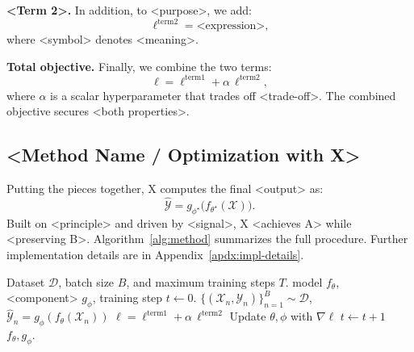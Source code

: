 \textbf{<Term 2>.} In addition, to <purpose>, we add:
\begin{equation} \label{eq:term-2}
    \ell^{\text{term2}} = \text{<expression>},
\end{equation}
where <symbol> denotes <meaning>.

\textbf{Total objective.} Finally, we combine the two terms:
\begin{equation} \label{eq:total}
    \ell = \ell^{\text{term1}} + \alpha \, \ell^{\text{term2}},
\end{equation}
where $\alpha$ is a scalar hyperparameter that trades off <trade-off>. The combined objective secures <both properties>.

\subsection{<Method Name / Optimization with X>} \label{sec:method-overall}
Putting the pieces together, X computes the final <output> as:
\begin{equation} \label{eq:final}
    \hat{\mathcal{Y}} = g_{\phi^{\star}}\big(f_{\theta^{\star}}(\mathcal{X})\big).
\end{equation}
Built on <principle> and driven by <signal>, X <achieves A> while <preserving B>.
Algorithm~\ref{alg:method} summarizes the full procedure.
Further implementation details are in Appendix~\ref{apdx:impl-details}.

\begin{algorithm}[t]
\captionsetup{labelformat=default,labelsep=colon,name=Algorithm}
   \caption{Training with X}
   \label{alg:method}
\begin{algorithmic}
    Dataset $\mathcal{D}$, batch size $B$, and maximum training steps $T$.
    model $f_\theta$, <component> $g_\phi$, training step $t \leftarrow 0$.
     \STATE {}
     \STATE $\{(\mathcal{X}_n, \mathcal{Y}_n)\}_{n=1}^{B} \sim \mathcal{D}$, \ $\hat{\mathcal{Y}}_n = g_\phi(f_\theta(\mathcal{X}_n))$
     \STATE {}
     \STATE $\ell = \ell^{\text{term1}} + \alpha\, \ell^{\text{term2}}$
     \STATE {}
     \STATE Update $\theta, \phi$ with $\nabla \ell$
     \STATE $t \leftarrow t + 1$
   \ENDWHILE
    $f_\theta, g_\phi$.
\end{algorithmic}
\end{algorithm}
